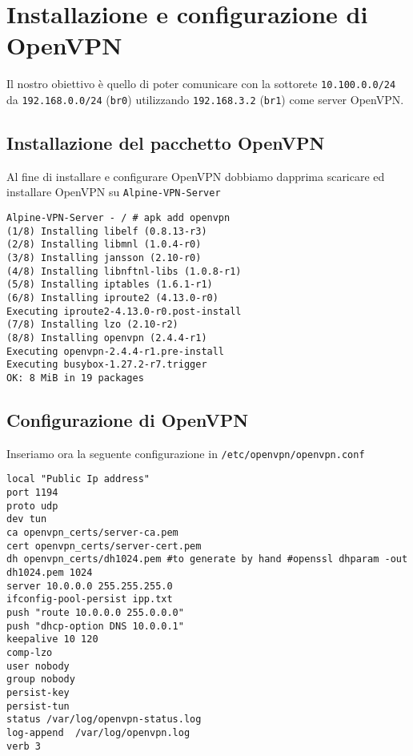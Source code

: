 \documentclass{article}
\newcommand{\interface}[1]{{\lstinline[basicstyle=\ttfamily\color{brown}]|#1|}}
\newcommand{\ipaddress}[1]{{\lstinline[basicstyle=\ttfamily\color{purple}]|#1|}}
\newcommand{\hostname}[1]{{\lstinline[basicstyle=\ttfamily\color{teal}]|#1|}}
\newcommand{\path}[1]{{\lstinline[basicstyle=\ttfamily\color{blue}]|#1|}}
\begin{document}
\section{Installazione e configurazione di OpenVPN}
Il nostro obiettivo è quello di poter comunicare con la sottorete \ipaddress{10.100.0.0/24} da
\ipaddress{192.168.0.0/24} (\interface{br0}) utilizzando \ipaddress{192.168.3.2} (\interface{br1})
come server OpenVPN.

\subsection{Installazione del pacchetto OpenVPN}
Al fine di installare e configurare OpenVPN dobbiamo dapprima scaricare ed installare 
OpenVPN su \hostname{Alpine-VPN-Server}

\begin{lstlisting}
Alpine-VPN-Server - / # apk add openvpn
(1/8) Installing libelf (0.8.13-r3)
(2/8) Installing libmnl (1.0.4-r0)
(3/8) Installing jansson (2.10-r0)
(4/8) Installing libnftnl-libs (1.0.8-r1)
(5/8) Installing iptables (1.6.1-r1)
(6/8) Installing iproute2 (4.13.0-r0)
Executing iproute2-4.13.0-r0.post-install
(7/8) Installing lzo (2.10-r2)
(8/8) Installing openvpn (2.4.4-r1)
Executing openvpn-2.4.4-r1.pre-install
Executing busybox-1.27.2-r7.trigger
OK: 8 MiB in 19 packages
\end{lstlisting}


\subsection{Configurazione di OpenVPN}
Inseriamo ora la seguente configurazione in \path{/etc/openvpn/openvpn.conf}
\begin{lstlisting}
local "Public Ip address"
port 1194
proto udp
dev tun
ca openvpn_certs/server-ca.pem
cert openvpn_certs/server-cert.pem
dh openvpn_certs/dh1024.pem #to generate by hand #openssl dhparam -out dh1024.pem 1024
server 10.0.0.0 255.255.255.0
ifconfig-pool-persist ipp.txt
push "route 10.0.0.0 255.0.0.0"
push "dhcp-option DNS 10.0.0.1"
keepalive 10 120
comp-lzo
user nobody
group nobody
persist-key
persist-tun
status /var/log/openvpn-status.log
log-append  /var/log/openvpn.log
verb 3
\end{lstlisting}
\end{document}
